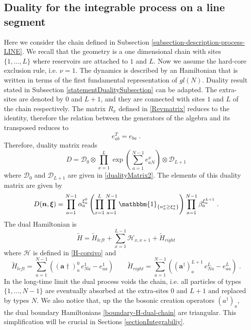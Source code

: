 \documentclass[10pt]{article}
\numberwithin{equation}{section}
\numberwithin{equation}{subsection}
\newcommand{\dt}{\;.}
\begin{document}
\subsection{Duality for the integrable process on a line segment}\label{integrableChain-duality}
Here we consider the chain defined in Subsection \ref{subsection-description-process-LINE}. We recall that the geometry is a one dimensional chain with sites $\{1,\ldots,L\}$ where reservoirs are attached to $1$ and $L$. Now we assume the hard-core exclusion rule, i.e. $\nu=1$. The dynamics is described by an Hamiltonian that is written in terms of the first fundamental representation of $gl(N)$. Duality result stated in Subsection \ref{statementDualitySubsection} can be adapted. The extra-sites are denoted by $0$ and $L+1$, and they are connected with sites $1$ and $L$ of the chain respectively. The matrix $R_{x}$ defined in \eqref{Revmatrix} 
reduces to the identity, therefore the relation between the generators of the algebra and its transposed reduces to
\begin{equation}\label{transpostionPropertyFund}
	e_{ab}^T= e_{ba}\dt
\end{equation}
Therefore, duality matrix reads
\begin{equation}
	D=\mathcal{D}_{0}\otimes\prod_{x=1}^{L}\exp{\left(\sum_{a=1}^{N-1}e_{aN}^{x}\right)}\otimes \mathcal{D}_{L+1}
\end{equation}
where $\mathcal{D}_{0}$ and $\mathcal{D}_{L+1}$ are given in \eqref{dualityMatrix2}. 
The elements of this duality matrix are given by
\begin{equation}\label{ElementsDualityMatrixChain}
	D(\bm{n},\bm{\xi})=\prod_{a=1}^{N-1}\alpha_{a}^{\xi_{a}^{0}}\left(\prod_{x=1}^{L}\prod_{a=1}^{N-1}\mathbbm{1}_{\{n_{a}^{x}\geq \xi_{a}^{x}\}}\right)\prod_{a=1}^{N-1}\beta_{a}^{\xi_{a}^{L+1}}\dt
\end{equation}
The dual Hamiltonian is
\begin{equation}
	\widetilde{H}=\widetilde{H}_{left}+\sum_{x=1}^{L-1}\mathcal{H}_{x,x+1}+\widetilde{H}_{right}
\end{equation}
where $\mathcal{H}$ is defined in \eqref{H-corsivo} and 
\begin{equation}\label{boundary-H-dual-chain}
	\widetilde{H}_{left}=\sum_{a=1}^{N-1}\left((\mathbf{a}{\dagger})_{a}^{0}\,e_{Na}^{1}-e_{aa}^{1}\right)\qquad 	\widetilde{H}_{right}=\sum_{a=1}^{N-1}\left((\mathbf{a}^{\dagger})_{a}^{L+1}\,e_{Na}^{L}-e_{aa}^{L}\right)\dt
\end{equation}
In the long-time limit the dual process voids the chain, i.e. all particles of types $\{1,\ldots,N-1\}$ are eventually absorbed at the extra-sites $0$ and $L+1$ and replaced by types $N$. We also notice that, up the the bosonic creation operators $(a^{\dagger})_{a}$, the dual boundary Hamiltonians \eqref{boundary-H-dual-chain} are triangular. This simplification will be crucial in Sections \ref{sectionIntegrabiliy}.\\
\end{document}
